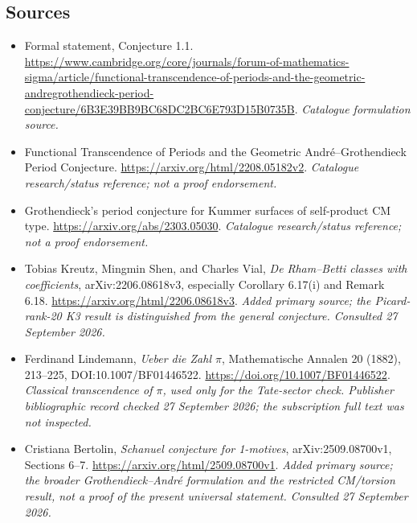 \documentclass[11pt,a4paper]{article}
\numberwithin{equation}{section}
\begin{document}
\subsection{Sources}
\begin{itemize}\raggedright
\item[\textnormal{[S1]}]\hypertarget{source:49:1}{} Formal statement, Conjecture 1.1.
\url{https://www.cambridge.org/core/journals/forum-of-mathematics-sigma/article/functional-transcendence-of-periods-and-the-geometric-andregrothendieck-period-conjecture/6B3E39BB9BC68DC2BC6E793D15B0735B}.
{\small\textit{Catalogue formulation source.}}
\item[\textnormal{[S2]}]\hypertarget{source:49:2}{} Functional Transcendence of Periods and the Geometric André--Grothendieck Period Conjecture.
\url{https://arxiv.org/html/2208.05182v2}.
{\small\textit{Catalogue research/status reference; not a proof endorsement.}}
\item[\textnormal{[S3]}]\hypertarget{source:49:3}{} Grothendieck's period conjecture for Kummer surfaces of self-product CM type.
\url{https://arxiv.org/abs/2303.05030}.
{\small\textit{Catalogue research/status reference; not a proof endorsement.}}
\item[\textnormal{[E1]}]\hypertarget{extra:49:1}{} Tobias Kreutz, Mingmin Shen, and Charles Vial, \emph{De Rham--Betti classes with coefficients}, arXiv:2206.08618v3, especially Corollary 6.17(i) and Remark 6.18.
\url{https://arxiv.org/html/2206.08618v3}.
{\small\textit{Added primary source; the Picard-rank-20 K3 result is distinguished from the general conjecture. Consulted 27 September 2026.}}
\item[\textnormal{[E2]}]\hypertarget{extra:49:2}{} Ferdinand Lindemann, \emph{Ueber die Zahl $\pi$}, Mathematische Annalen 20 (1882), 213--225, DOI:10.1007/BF01446522.
\url{https://doi.org/10.1007/BF01446522}.
{\small\textit{Classical transcendence of $\pi$, used only for the Tate-sector check. Publisher bibliographic record checked 27 September 2026; the subscription full text was not inspected.}}
\item[\textnormal{[E3]}]\hypertarget{extra:49:3}{} Cristiana Bertolin, \emph{Schanuel conjecture for 1-motives}, arXiv:2509.08700v1, Sections 6--7.
\url{https://arxiv.org/html/2509.08700v1}.
{\small\textit{Added primary source; the broader Grothendieck--Andr\'e formulation and the restricted CM/torsion result, not a proof of the present universal statement. Consulted 27 September 2026.}}
\end{itemize}
\end{document}

